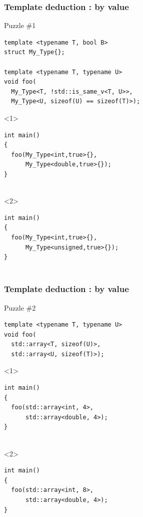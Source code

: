 \documentclass[14pt]{beamer}
\begin{document}
\begin{frame}[fragile]
  \frametitle{Template deduction : by value}

  Puzzle \#1

  \begin{lstlisting}[basicstyle=\codefontsize{10pt}]
template <typename T, bool B>
struct My_Type{};

template <typename T, typename U>
void foo(
  My_Type<T, !std::is_same_v<T, U>>,
  My_Type<U, sizeof(U) == sizeof(T)>);
  \end{lstlisting}

  \begin{onlyenv}<1>
    \begin{lstlisting}[basicstyle=\codefontsize{10pt}]
int main()
{
  foo(My_Type<int,true>{}, 
      My_Type<double,true>{});
}
      
    \end{lstlisting}
  \end{onlyenv}

  \begin{onlyenv}<2>
    \begin{lstlisting}[basicstyle=\codefontsize{10pt}]
int main()
{
  foo(My_Type<int,true>{}, 
      My_Type<unsigned,true>{});
}
      
    \end{lstlisting}
  \end{onlyenv}

\end{frame}

\begin{frame}[fragile]
  \frametitle{Template deduction : by value}

    Puzzle \#2

  \begin{lstlisting}[basicstyle=\codefontsize{10pt}]
template <typename T, typename U>
void foo(
  std::array<T, sizeof(U)>,
  std::array<U, sizeof(T)>);
  \end{lstlisting}

  \begin{onlyenv}<1>
  \begin{lstlisting}[basicstyle=\codefontsize{10pt}]
int main()
{
  foo(std::array<int, 4>,
      std::array<double, 4>);
}
    
  \end{lstlisting}
  \end{onlyenv}

  \begin{onlyenv}<2>
    \begin{lstlisting}[basicstyle=\codefontsize{10pt}]
int main()
{
  foo(std::array<int, 8>,
      std::array<double, 4>);
}
      
    \end{lstlisting}
  \end{onlyenv}

\end{frame}
\end{document}
